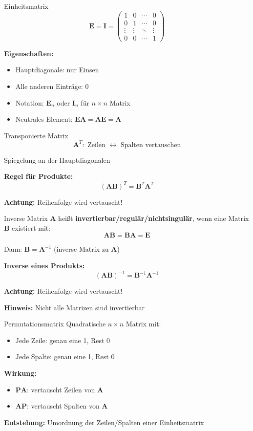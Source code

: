 \documentclass[a4paper, fontsize=7pt]{scrartcl}
\begin{document}
\begin{mainbox}{Einheitsmatrix}
$$\mathbf{E} = \mathbf{I} = \begin{pmatrix}
1 & 0 & \cdots & 0 \\
0 & 1 & \cdots & 0 \\
\vdots & \vdots & \ddots & \vdots \\
0 & 0 & \cdots & 1
\end{pmatrix}$$

\textbf{Eigenschaften:}
\begin{itemize}
    \item Hauptdiagonale: nur Einsen
    \item Alle anderen Einträge: 0
    \item Notation: $\mathbf{E}_n$ oder $\mathbf{I}_n$ für $n \times n$ Matrix
    \item Neutrales Element: $\mathbf{EA} = \mathbf{AE} = \mathbf{A}$
\end{itemize}
\end{mainbox}

\begin{mainbox}{Transponierte Matrix}
$$\mathbf{A}^T: \text{ Zeilen } \leftrightarrow \text{ Spalten vertauschen}$$

Spiegelung an der Hauptdiagonalen

\textbf{Regel für Produkte:}
$$(\mathbf{AB})^T = \mathbf{B}^T \mathbf{A}^T$$

\textbf{Achtung:} Reihenfolge wird vertauscht!
\end{mainbox}

\begin{mainbox}{Inverse Matrix}
$\mathbf{A}$ heißt \textbf{invertierbar/regulär/nichtsingulär}, wenn eine Matrix $\mathbf{B}$ existiert mit:
$$\mathbf{AB} = \mathbf{BA} = \mathbf{E}$$

Dann: $\mathbf{B} = \mathbf{A}^{-1}$ (inverse Matrix zu $\mathbf{A}$)

\textbf{Inverse eines Produkts:}
$$(\mathbf{AB})^{-1} = \mathbf{B}^{-1}\mathbf{A}^{-1}$$

\textbf{Achtung:} Reihenfolge wird vertauscht!

\textbf{Hinweis:} Nicht alle Matrizen sind invertierbar
\end{mainbox}

\begin{mainbox}{Permutationsmatrix}
Quadratische $n \times n$ Matrix mit:
\begin{itemize}
    \item Jede Zeile: genau eine 1, Rest 0
    \item Jede Spalte: genau eine 1, Rest 0
\end{itemize}

\textbf{Wirkung:}
\begin{itemize}
    \item $\mathbf{PA}$: vertauscht Zeilen von $\mathbf{A}$
    \item $\mathbf{AP}$: vertauscht Spalten von $\mathbf{A}$
\end{itemize}

\textbf{Entstehung:} Umordnung der Zeilen/Spalten einer Einheitsmatrix
\end{mainbox}
\end{document}
